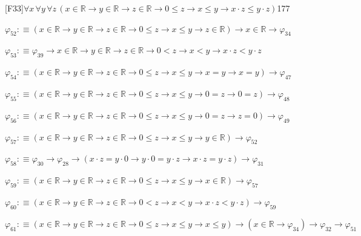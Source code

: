 \begin{fullproof}{[F33]}{$\forall x\,\forall y\,\forall z\,(x \in \mathbb{R} \to y \in \mathbb{R} \to z \in \mathbb{R} \to 0 \leq z \to x \leq y \to x \cdot z \leq y \cdot z)$}{177}
\begin{abbrevlist}
\item $\varphi_{52} :\equiv (x \in \mathbb{R} \to y \in \mathbb{R} \to z \in \mathbb{R} \to 0 \leq z \to x \leq y \to z \in \mathbb{R}) \to x \in \mathbb{R} \to \varphi_{34}$
\item $\varphi_{53} :\equiv \varphi_{39} \to x \in \mathbb{R} \to y \in \mathbb{R} \to z \in \mathbb{R} \to 0 < z \to x < y \to x \cdot z < y \cdot z$
\item $\varphi_{54} :\equiv (x \in \mathbb{R} \to y \in \mathbb{R} \to z \in \mathbb{R} \to 0 \leq z \to x \leq y \to x = y \to x = y) \to \varphi_{47}$
\item $\varphi_{55} :\equiv (x \in \mathbb{R} \to y \in \mathbb{R} \to z \in \mathbb{R} \to 0 \leq z \to x \leq y \to 0 = z \to 0 = z) \to \varphi_{48}$
\item $\varphi_{56} :\equiv (x \in \mathbb{R} \to y \in \mathbb{R} \to z \in \mathbb{R} \to 0 \leq z \to x \leq y \to 0 = z \to z = 0) \to \varphi_{49}$
\item $\varphi_{57} :\equiv (x \in \mathbb{R} \to y \in \mathbb{R} \to z \in \mathbb{R} \to 0 \leq z \to x \leq y \to y \in \mathbb{R}) \to \varphi_{52}$
\item $\varphi_{58} :\equiv \varphi_{30} \to \varphi_{28} \to (x \cdot z = y \cdot 0 \to y \cdot 0 = y \cdot z \to x \cdot z = y \cdot z) \to \varphi_{31}$
\item $\varphi_{59} :\equiv (x \in \mathbb{R} \to y \in \mathbb{R} \to z \in \mathbb{R} \to 0 \leq z \to x \leq y \to x \in \mathbb{R}) \to \varphi_{57}$
\item $\varphi_{60} :\equiv (x \in \mathbb{R} \to y \in \mathbb{R} \to z \in \mathbb{R} \to 0 < z \to x < y \to x \cdot z < y \cdot z) \to \varphi_{59}$
\item $\varphi_{61} :\equiv (x \in \mathbb{R} \to y \in \mathbb{R} \to z \in \mathbb{R} \to 0 \leq z \to x \leq y \to x \leq y) \to (x \in \mathbb{R} \to \varphi_{34}) \to \varphi_{32} \to \varphi_{51}$
\end{abbrevlist}
\end{fullproof}
